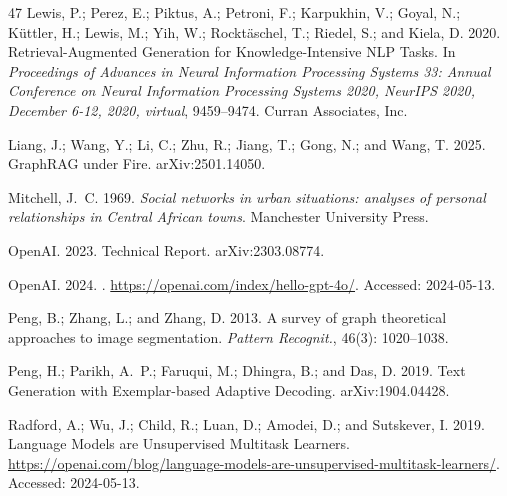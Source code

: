 \documentclass[letterpaper]{article} %
\begin{document}
\begin{thebibliography}{47}
    Lewis, P.; Perez, E.; Piktus, A.; Petroni, F.; Karpukhin, V.; Goyal, N.; K{\"{u}}ttler, H.; Lewis, M.; Yih, W.; Rockt{\"{a}}schel, T.; Riedel, S.; and Kiela, D. 2020.
    \newblock Retrieval-Augmented Generation for Knowledge-Intensive {NLP} Tasks.
    \newblock In \emph{Proceedings of Advances in Neural Information Processing Systems 33: Annual Conference on Neural Information Processing Systems 2020, NeurIPS 2020, December 6-12, 2020, virtual}, 9459--9474. Curran Associates, Inc.
    
    Liang, J.; Wang, Y.; Li, C.; Zhu, R.; Jiang, T.; Gong, N.; and Wang, T. 2025.
    \newblock GraphRAG under Fire.
    \newblock arXiv:2501.14050.
    
    Mitchell, J.~C. 1969.
    \newblock \emph{Social networks in urban situations: analyses of personal relationships in Central African towns}.
    \newblock Manchester University Press.
    
    OpenAI. 2023.
     Technical Report.
    \newblock arXiv:2303.08774.
    
    {OpenAI}. 2024.
    .
    \newblock \url{https://openai.com/index/hello-gpt-4o/}.
    \newblock Accessed: 2024-05-13.
    
    Peng, B.; Zhang, L.; and Zhang, D. 2013.
    \newblock A survey of graph theoretical approaches to image segmentation.
    \newblock \emph{Pattern Recognit.}, 46(3): 1020--1038.
    
    Peng, H.; Parikh, A.~P.; Faruqui, M.; Dhingra, B.; and Das, D. 2019.
    \newblock Text Generation with Exemplar-based Adaptive Decoding.
    \newblock arXiv:1904.04428.
    
    Radford, A.; Wu, J.; Child, R.; Luan, D.; Amodei, D.; and Sutskever, I. 2019.
    \newblock Language Models are Unsupervised Multitask Learners.
    \newblock \url{https://openai.com/blog/language-models-are-unsupervised-multitask-learners/}.
    \newblock Accessed: 2024-05-13.
    

\end{thebibliography}
\end{document}
